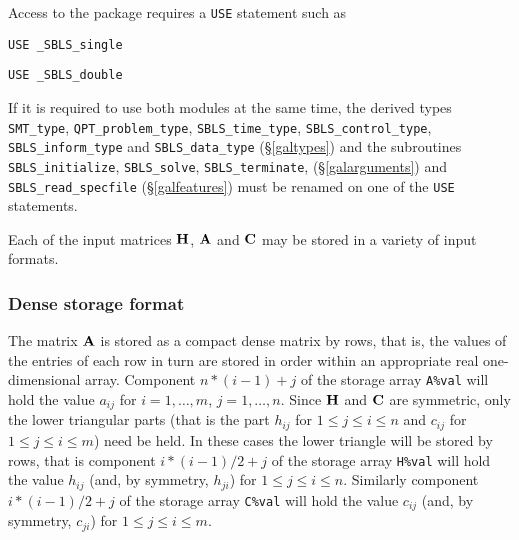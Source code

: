 \documentclass{galahad}
\newcommand{\packagename}{SBLS}
\newcommand{\fullpackagename}{\libraryname\_\packagename}
\begin{document}
\galhowto


Access to the package requires a {\tt USE} statement such as

\medskip{}

\hspace{8mm} {\tt USE \fullpackagename\_single}

\medskip{}

\hspace{8mm} {\tt USE  \fullpackagename\_double}

\medskip

\noindent
If it is required to use both modules at the same time, the derived types
{\tt SMT\_type},
{\tt QPT\_problem\_type},
{\tt \packagename\_time\_type},
{\tt \packagename\_control\_type},
{\tt \packagename\_inform\_type}
and
{\tt \packagename\_data\_type}
(\S\ref{galtypes})
and the subroutines
{\tt \packagename\_initialize},
{\tt \packagename\_\-solve},
{\tt \packagename\_terminate},
(\S\ref{galarguments})
and
{\tt \packagename\_read\_specfile}
(\S\ref{galfeatures})
must be renamed on one of the {\tt USE} statements.


\galmatrix
Each of the input matrices ${\mathbf{H}}$, ${\mathbf{A}}$ and ${\mathbf{C}}$
may be stored in a variety of input formats.

\subsubsection{Dense storage format}\label{dense}
The matrix ${\mathbf{A}}$ is stored as a compact
dense matrix by rows, that is, the values of the entries of each row in turn are
stored in order within an appropriate real one-dimensional array.
Component $n \ast (i-1) + j$ of the storage array {\tt A\%val} will hold the
value $a_{ij}$ for $i = 1, \ldots , m$, $j = 1, \ldots , n$.
Since ${\mathbf{H}}$ and ${\mathbf{C}}$ are symmetric, only the lower triangular parts
(that is the part $h_{ij}$ for $1 \leq j \leq i \leq n$ and
$c_{ij}$ for $1 \leq j \leq i \leq m$) need be held. In these cases
the lower triangle will be stored by rows, that is
component $i \ast (i-1)/2 + j$ of the storage array {\tt H\%val}
will hold the value $h_{ij}$ (and, by symmetry, $h_{ji}$)
for $1 \leq j \leq i \leq n$. Similarly
component $i \ast (i-1)/2 + j$ of the storage array {\tt C\%val}
will hold the value $c_{ij}$ (and, by symmetry, $c_{ji}$)
for $1 \leq j \leq i \leq m$.
\end{document}
